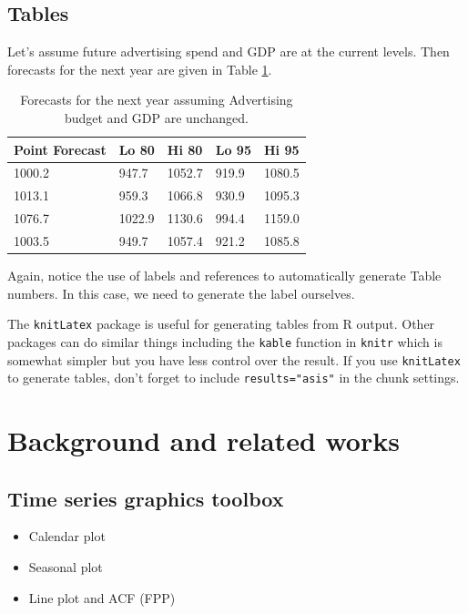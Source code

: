 \documentclass{aucklandthesis}
\begin{document}
\hypertarget{tables}{%
\section{Tables}\label{tables}}

Let's assume future advertising spend and GDP are at the current levels. Then forecasts for the next year are given in Table \ref{tab:salesforecasts}.

\begin{table}[ht]
\begin{center}
\begin{tabular}{lllll}
\toprule
Point Forecast & Lo 80 & Hi 80 & Lo 95 & Hi 95 \\
\midrule
1000.2 &  947.7 & 1052.7 & 919.9 & 1080.5 \\
1013.1 &  959.3 & 1066.8 & 930.9 & 1095.3 \\
1076.7 & 1022.9 & 1130.6 & 994.4 & 1159.0 \\
1003.5 &  949.7 & 1057.4 & 921.2 & 1085.8 \\
\bottomrule
\end{tabular}
\caption{Forecasts for the next year assuming Advertising budget and GDP are unchanged.}
\label{tab:salesforecasts}
\end{center}
\end{table}

Again, notice the use of labels and references to automatically generate Table numbers. In this case, we need to generate the label ourselves.

The \texttt{knitLatex} package is useful for generating tables from R output. Other packages can do similar things including the \texttt{kable} function in \texttt{knitr} which is somewhat simpler but you have less control over the result. If you use \texttt{knitLatex} to generate tables, don't forget to include \texttt{results="asis"} in the chunk settings.

\hypertarget{ch:litreview}{%
\chapter{Background and related works}\label{ch:litreview}}

\hypertarget{time-series-graphics-toolbox}{%
\section{Time series graphics toolbox}\label{time-series-graphics-toolbox}}

\begin{itemize}
\tightlist
\item
  Calendar plot
\item
  Seasonal plot
\item
  Line plot and ACF (FPP)
\end{itemize}
\end{document}
